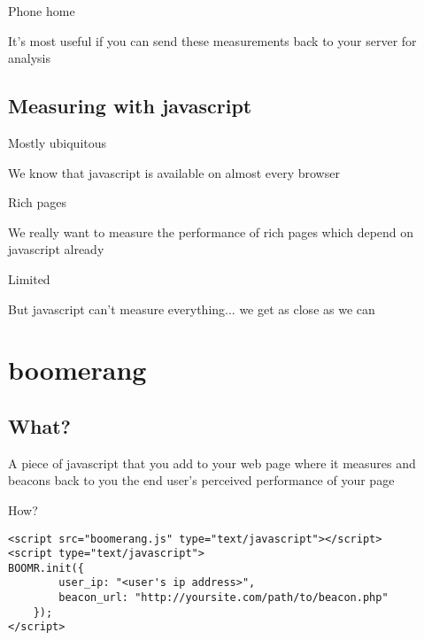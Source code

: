 \documentclass{beamer}
\begin{document}
\begin{frame}{Phone home}
  \begin{center}
  It's most useful if you can send these measurements back to your server for analysis
  \end{center}
\end{frame}

\subsection{Measuring with javascript}

\begin{frame}{Mostly ubiquitous}
  \begin{center}
  We know that javascript is available on almost every browser
  \end{center}
\end{frame}

\begin{frame}{Rich pages}
  \begin{center}
  We really want to measure the performance of rich pages which depend on javascript already
  \end{center}
\end{frame}

\begin{frame}{Limited}
  \begin{center}
  But javascript can't measure everything... we get as close as we can
  \end{center}
\end{frame}

\section{boomerang}

\subsection{What?}

\begin{frame}
  \begin{block}{}
A piece of javascript that you add to your web page where it measures and beacons back to you the end user's perceived performance of your page
  \end{block}
\end{frame}

\begin{frame}[fragile]{How?}
  \begin{verbatim}
<script src="boomerang.js" type="text/javascript"></script>
<script type="text/javascript">
BOOMR.init({
		user_ip: "<user's ip address>",
		beacon_url: "http://yoursite.com/path/to/beacon.php"
	});
</script>
  \end{verbatim}
\end{frame}
\end{document}
